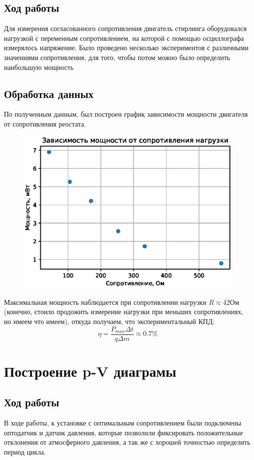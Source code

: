 \documentclass[a4paper,14pt]{extarticle}
\begin{document}
		\subsection{Ход работы}
			Для измерения согласованного сопротивления двигатель стирлинга оборудовался нагрузкой с переменным сопротивлением, на которой с помощью осциллографа измерялось напряжение. Было проведено несколько экспериментов с различными значениями сопротивления, для того, чтобы потом можно было определить наибольшую мощность
		\subsection{Обработка данных}
			По полученным данным, был построен график зависимости мощности двигателя от сопротивления реостата.
			\begin{figure}[h!]
				\centering
				\includegraphics[width=.85\linewidth]{Lab4_2.eps}
				\caption{}
				\label{fig4}
			\end{figure}
		
			Максимальная мощность наблюдается при сопротивлении нагрузки $R \approx 42 \text{Ом}$(конечно, стоило продожить измерение нагрузки при меньших сопротивлениях, но имеем что имеем), откуда получаем, что экспериментальный КПД:
			\begin{equation}
				\eta = \frac{P_{max} \Delta t}{q \Delta m} \approx 0.7 \%
			\end{equation}
	\section{Построение p-V диаграмы}
		\subsection{Ход работы}
			В ходе работы, к установке с оптимальным сопротивлением были подключены оптодатчик и датчик давления, которые позволили фиксировать положительные отклонения от атмосферного давления, а так же с хорошей точностью определить период цикла. 
\end{document}
